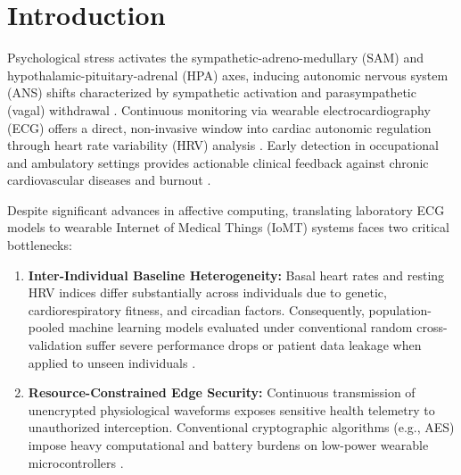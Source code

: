 \documentclass[preprint,12pt,3p]{elsarticle}
\begin{document}
\section{Introduction}
Psychological stress activates the sympathetic-adreno-medullary (SAM) and hypothalamic-pituitary-adrenal (HPA) axes, inducing autonomic nervous system (ANS) shifts characterized by sympathetic activation and parasympathetic (vagal) withdrawal \cite{kirschbaum1993trier, kim2018stress}. Continuous monitoring via wearable electrocardiography (ECG) offers a direct, non-invasive window into cardiac autonomic regulation through heart rate variability (HRV) analysis \cite{taskforce1996hrv, shaffer2017overview}. Early detection in occupational and ambulatory settings provides actionable clinical feedback against chronic cardiovascular diseases and burnout \cite{healey2005detecting, can2019continuous}.

Despite significant advances in affective computing, translating laboratory ECG models to wearable Internet of Medical Things (IoMT) systems \cite{alturjman2020iomt, jiang2023wban} faces two critical bottlenecks:
\begin{enumerate}
    \item \textbf{Inter-Individual Baseline Heterogeneity:} Basal heart rates and resting HRV indices differ substantially across individuals due to genetic, cardiorespiratory fitness, and circadian factors. Consequently, population-pooled machine learning models evaluated under conventional random cross-validation suffer severe performance drops or patient data leakage when applied to unseen individuals \cite{saeb2017need, schmidt2018wesad, plarre2011continuous}.
    \item \textbf{Resource-Constrained Edge Security:} Continuous transmission of unencrypted physiological waveforms exposes sensitive health telemetry to unauthorized interception. Conventional cryptographic algorithms (e.g., AES) impose heavy computational and battery burdens on low-power wearable microcontrollers \cite{fotiadis2020wearable}.
\end{enumerate}
\end{document}
